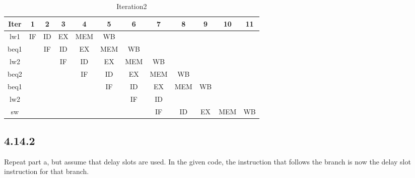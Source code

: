 \documentclass[paper=a4, fontsize=11pt]{scrartcl} %
\begin{document}
\begin{table}[hp]
    \caption{Iteration2}\label{tab:iteration1}
    \begin{center}
        \begin{tabular}{cccccccccccc}
        \toprule
        \textbf{Iter} & \textbf{1} & \textbf{2} & \textbf{3} & \textbf{4} & \textbf{5}
        & \textbf{6} & \textbf{7} & \textbf{8} & \textbf{9} & \textbf{10} & \textbf{11}\\
        \midrule
        lw1  & IF & ID & EX & MEM & WB &    &    &    &    &    & \\
        beq1 &    & IF & ID & EX & MEM & WB &    &    &    &    & \\
        lw2  &    &    & IF & ID & EX & MEM & WB &    &    &    & \\
        beq2 &    &    &    & IF & ID & EX & MEM & WB &    &    & \\
        beq1 &    &    &    &    & IF & ID & EX & MEM & WB &    & \\
        lw2  &    &    &    &    &    & IF & ID &     &    &    & \\
        sw   &    &    &    &    &    &    & IF & ID & EX & MEM & WB \\
        \bottomrule
        \end{tabular}
    \end{center}
\end{table}


\subsection{4.14.2}
\begin{fancyquotes}
    Repeat part a, but assume that delay slots are used. In the given code, the instruction that follows the branch is now the delay slot instruction for that branch.
\end{fancyquotes}
\end{document}
